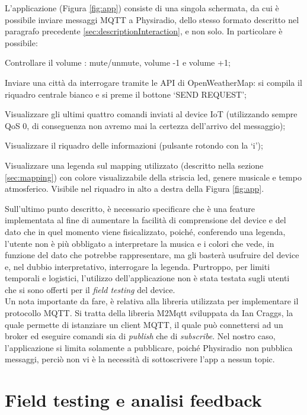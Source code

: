 \documentclass[12pt,a4paper]{report}
\newcommand{\physiradio}{Physiradio} %
\begin{document}
\newpage
L'applicazione (Figura \ref{fig:app}) consiste di una singola schermata, da cui è possibile inviare messaggi MQTT a \physiradio, dello stesso formato descritto nel paragrafo precedente \ref{sec:descriptionInteraction}, e non solo. In particolare è possibile:
\begin{compactitem}
	\item Controllare il volume : mute/unmute, volume -1 e volume +1;
	\item Inviare una città da interrogare tramite le API di OpenWeatherMap: si compila il riquadro centrale bianco e si preme il bottone `SEND REQUEST';
	\item Visualizzare gli ultimi quattro comandi inviati al device IoT (utilizzando sempre QoS 0, di conseguenza non avremo mai la certezza dell'arrivo del messaggio);
	\item Visualizzare il riquadro delle informazioni (pulsante rotondo con la `i');
	\item Visualizzare una legenda sul mapping utilizzato (descritto nella sezione \ref{sec:mapping}) con colore visualizzabile della striscia led, genere musicale e tempo atmosferico. Visibile nel riquadro in alto a destra della Figura \ref{fig:app}.
\end{compactitem}
Sull'ultimo punto descritto, è necessario specificare che è una feature implementata al fine di aumentare la facilità di comprensione del device e del dato che in quel momento viene fisicalizzato, poiché, conferendo una legenda, l'utente non è più obbligato a interpretare la musica e i colori che vede, in funzione del dato che potrebbe rappresentare, ma gli basterà usufruire del device e, nel dubbio interpretativo, interrogare la legenda. Purtroppo, per limiti temporali e logistici, l'utilizzo dell'applicazione non è stata testata sugli utenti che si sono offerti per il \textit{field testing} del device.\\

Un nota importante da fare, è relativa alla libreria utilizzata per implementare il protocollo MQTT. Si tratta della libreria M2Mqtt\cite{mqttUnity} sviluppata da Ian Craggs, la quale permette di istanziare un client MQTT, il quale può connettersi ad un broker ed eseguire comandi sia di \textit{publish} che di \textit{subscribe}. Nel nostro caso, l'applicazione si limita solamente a pubblicare, poiché \physiradio\ non pubblica messaggi, perciò non vi è la necessità di sottoscrivere l'app a nessun topic.

\chapter{Field testing e analisi feedback}
\end{document}
